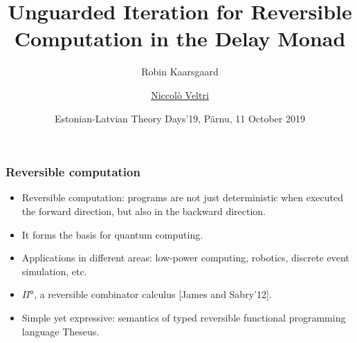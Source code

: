 \documentclass[12pt,t]{beamer}
\newcommand{\Pio}{\ensuremath{\mathsf{\Pi}^{\mathsf{o}}}}
\begin{document}

\title{Unguarded Iteration for Reversible Computation in the
  Delay Monad}


\author{Robin Kaarsgaard  \and \underline{Niccol\`o Veltri} }
\date{Estonian-Latvian Theory Days'19, P\"arnu, 11 October 2019}

\begin{frame}

\maketitle

\end{frame}


\begin{frame}

  \frametitle{Reversible computation}

  \begin{itemize}

  \item Reversible computation: programs are not just deterministic when
    executed the forward direction, but also in the
    backward direction.
  \item It forms the basis for quantum computing.
  \item Applications in different areas: low-power computing, robotics,
    discrete event simulation, etc.

    \pause
    \vspace{\fill}
    
  \item \Pio, a reversible combinator calculus [James and Sabry'12].
  \item Simple yet expressive: semantics of typed reversible
    functional programming language Theseus.
  \end{itemize}

\end{frame}
\end{document}

